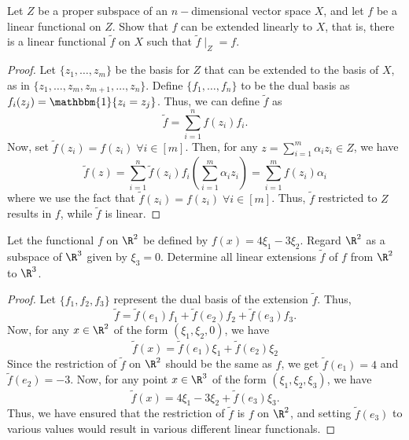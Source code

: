 \begin{question}
    Let $Z$ be a proper subspace of an $n-$dimensional vector space $X$, and let $f$ be a linear functional on $Z$. Show that $f$ can be extended linearly to $X$, that is, there is a linear functional $\tilde{f}$ on $X$ such that $\tilde{f}\mid_Z = f$.
    \label{section2.9-13}
\end{question}
\begin{proof}
        Let $\{z_1 , \ldots , z_m\}$ be the basis for $Z$ that can be extended to the basis of $X$, as in $\{z_1 , \ldots , z_m , z_{m+1} , \ldots , z_n\}$. Define $\{f_1 , \ldots  ,f_n\}$ to be the dual basis as $f_i(z_j) = \mathbbm{1}\{z_i = z_j\}$. Thus, we can define $\tilde{f}$ as
        \[\tilde{f} = \sum_{i=1}^n f(z_i) f_i.\]
        Now, set $\tilde{f}(z_i) = f(z_i) \;\forall i \in [m]$. Then, for any $z = \sum_{i=1}^m \alpha_i z_i \in Z$, we have
        \[\tilde{f}(z) = \sum_{i=1}^n \tilde{f}(z_i) f_i\left(\sum_{i=1}^m \alpha_i z_i\right)  = \sum_{i=1}^m f(z_i) \alpha_i\]
        where we use the fact that $\tilde{f}(z_i) = f(z_i) \;\forall i \in [m]$. Thus, $\tilde{f}$ restricted to $Z$ results in $f$, while $\tilde{f}$ is linear.
\end{proof}

\begin{question}
    Let the functional $f$ on $\R^2$ be defined by $f(x) = 4\xi_1 - 3\xi_2$. Regard $\R^2$ as a subspace of $\R^3$ given by $\xi_3 = 0$. Determine all linear extensions $\tilde{f}$ of $f$ from $\R^2$ to $\R^3$.
    \label{section2.9-14}
\end{question}
\begin{proof}
   Let $\{f_1 , f_2 , f_3\}$ represent the dual basis of the extension $\tilde{f}$. Thus, 
   \[\tilde{f} = \tilde{f}(e_1)f_1 + \tilde{f}(e_2)f_2 + \tilde{f}(e_3)f_3.\]
   Now, for any $x \in \R^2$ of the form $(\xi_1 , \xi_2 ,0)$, we have
   \[\tilde{f}(x) = \tilde{f}(e_1)\xi_1 + \tilde{f}(e_2)\xi_2\]
   Since the restriction of $\tilde{f}$ on $\R^2$ should be the same as $f$, we get $\tilde{f}(e_1) = 4$ and $\tilde{f}(e_2) = -3$.
   Now, for any point $x \in \R^3$ of the form $(\xi_1 , \xi_2 , \xi_3)$, we have
   \[\tilde{f}(x) = 4\xi_1 - 3 \xi_2 + \tilde{f}(e_3) \xi_3.\]
   Thus, we have ensured that the restriction of $\tilde{f}$ is $f$ on $\R^2$, and setting $\tilde{f}(e_3)$ to various values would result in various different linear functionals.
    
\end{proof}


